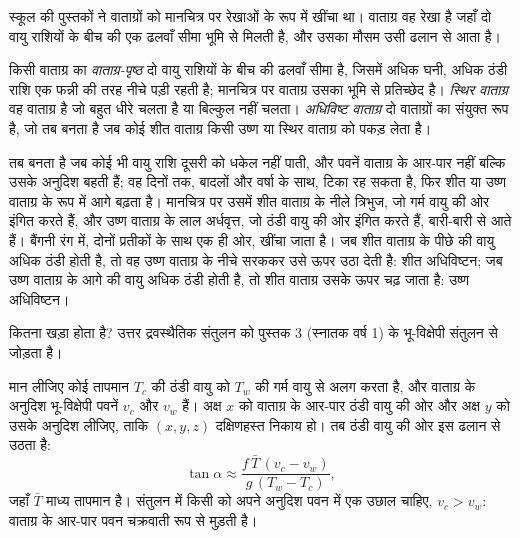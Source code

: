 स्कूल की पुस्तकों ने वाताग्रों को मानचित्र पर रेखाओं के रूप में खींचा था। वाताग्र वह रेखा है जहाँ दो वायु
राशियों के बीच की एक ढलवाँ सीमा भूमि से मिलती है, और उसका मौसम उसी ढलान से आता है।

\begin{definition}[वाताग्र-पृष्ठ; स्थिर वाताग्र; अधिविष्ट वाताग्र]\label{def:b2:weather-systems:fronts}
किसी वाताग्र का \emph{वाताग्र-पृष्ठ} दो वायु राशियों के बीच की ढलवाँ सीमा है,
जिसमें अधिक घनी, अधिक ठंडी राशि एक फन्नी की तरह नीचे पड़ी रहती है; मानचित्र पर वाताग्र उसका
भूमि से प्रतिच्छेद है। \emph{स्थिर वाताग्र} वह वाताग्र है
जो बहुत धीरे चलता है या बिल्कुल नहीं चलता। \emph{अधिविष्ट वाताग्र} दो वाताग्रों का
संयुक्त रूप है, जो तब बनता है जब कोई शीत वाताग्र किसी उष्ण या स्थिर वाताग्र को पकड़ लेता है।
\end{definition}

 तब बनता है जब कोई भी वायु राशि दूसरी को धकेल नहीं पाती, और पवनें वाताग्र के आर-पार
नहीं बल्कि उसके अनुदिश बहती हैं; वह दिनों तक, बादलों और वर्षा के साथ, टिका रह सकता है, फिर शीत
या उष्ण वाताग्र के रूप में आगे बढ़ता है। मानचित्र पर उसमें शीत वाताग्र के नीले त्रिभुज, जो गर्म वायु की ओर
इंगित करते हैं, और उष्ण वाताग्र के लाल अर्धवृत्त, जो ठंडी वायु की ओर इंगित करते हैं, बारी-बारी से आते हैं।  बैंगनी रंग में, दोनों प्रतीकों के साथ एक ही ओर, खींचा जाता है। जब शीत वाताग्र के पीछे की वायु
अधिक ठंडी होती है, तो वह उष्ण वाताग्र के नीचे सरककर उसे ऊपर उठा देती है: शीत अधिविष्टन; जब उष्ण वाताग्र के
आगे की वायु अधिक ठंडी होती है, तो शीत वाताग्र उसके ऊपर चढ़ जाता है: उष्ण अधिविष्टन।

 कितना खड़ा होता है? उत्तर द्रवस्थैतिक संतुलन को पुस्तक 3 (स्नातक वर्ष 1) के भू-विक्षेपी
संतुलन से जोड़ता है।

\begin{proposition}[वाताग्र-पृष्ठ की ढलान]\label{prop:b2:weather-systems:slope}
मान लीजिए कोई  तापमान $T_c$ की ठंडी वायु को $T_w$ की गर्म वायु से अलग करता है, और
वाताग्र के अनुदिश भू-विक्षेपी पवनें $v_c$ और $v_w$ हैं। अक्ष $x$ को वाताग्र के आर-पार ठंडी वायु की ओर
और अक्ष $y$ को उसके अनुदिश लीजिए, ताकि $(x, y, z)$ दक्षिणहस्त निकाय हो। तब 
ठंडी वायु की ओर इस ढलान से उठता है:
\[
  \tan\alpha \approx \frac{f\,\bar T\,(v_c - v_w)}{g\,(T_w - T_c)},
\]
जहाँ $\bar T$ माध्य तापमान है। संतुलन में किसी  को अपने अनुदिश पवन में एक उछाल चाहिए,
$v_c > v_w$: वाताग्र के आर-पार पवन चक्रवाती रूप से मुड़ती है।
\end{proposition}

